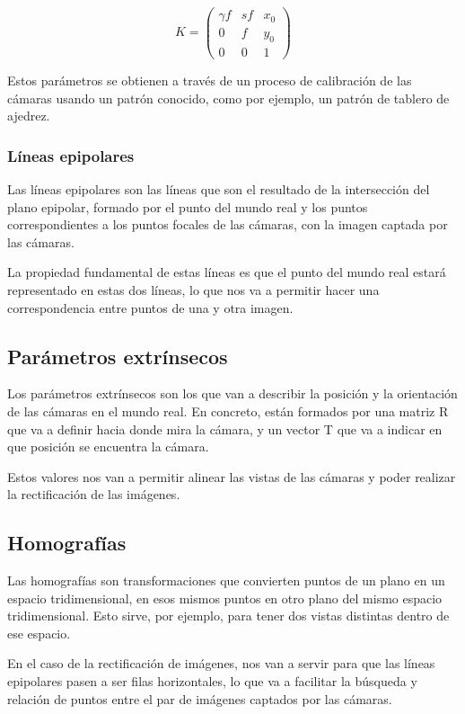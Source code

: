 \[
K=
\begin{pmatrix}
	\gamma f & s f & x_{0} \\
	0 & f & y_{0} \\
	0 & 0 & 1
\end{pmatrix}
\]

Estos parámetros se obtienen a través de un proceso de calibración de las cámaras usando un patrón conocido, como por ejemplo, un patrón de tablero de ajedrez.

\subsubsection{Líneas epipolares}
Las líneas epipolares son las líneas que son el resultado de la intersección del plano epipolar, formado por el punto del mundo real y los puntos correspondientes a los puntos focales de las cámaras, con la imagen captada por las cámaras. 

La propiedad fundamental de estas líneas es que el punto del mundo real estará representado en estas dos líneas, lo que nos va a permitir hacer una correspondencia entre puntos de una y otra imagen.


\subsection{Parámetros extrínsecos}
Los parámetros extrínsecos son los que van a describir la posición y la orientación de las cámaras en el mundo real. En concreto, están formados por una matriz R que va a definir hacia donde mira la cámara, y un vector T que va a indicar en que posición se encuentra la cámara.

Estos valores nos van a permitir alinear las vistas de las cámaras y poder realizar la rectificación de las imágenes.

\subsection{Homografías}
Las homografías son transformaciones que convierten puntos de un plano en un espacio tridimensional, en esos mismos puntos en otro plano del mismo espacio tridimensional. Esto sirve, por ejemplo, para tener dos vistas distintas dentro de ese espacio.

En el caso de la rectificación de imágenes, nos van a servir para que las líneas epipolares pasen a ser filas horizontales, lo que va a facilitar la búsqueda y relación de puntos entre el par de imágenes captados por las cámaras.

